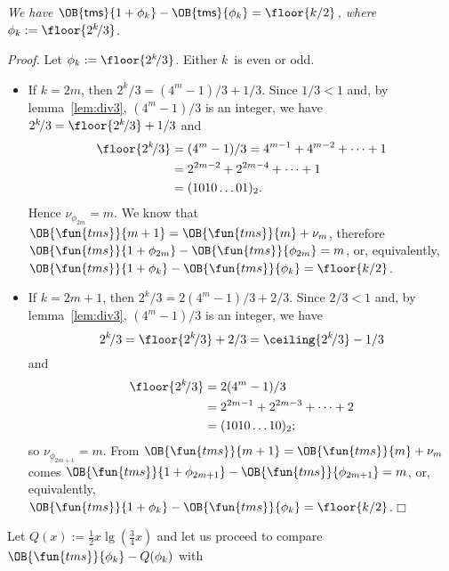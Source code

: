 \begin{thm}
\label{thm:OB_lambda}
\textsl{We have \(\OB{\mathsf{tms}}{1+\phi_k} -
  \OB{\mathsf{tms}}{\phi_k} = \floor{k/2}\), where \(\phi_k :=
  \floor{2^k\!/3}\).}
\end{thm}
\noindent \emph{Proof.} Let \(\phi_k := \floor{2^k\!/3}\). Either
\(k\)~is even or odd.
\begin{itemize}

  \item If \(k=2m\), then \(2^k\!/3 = (4^m-1)/3 + 1/3\). Since
    \(1/3<1\) and, by lemma~\ref{lem:div3}, \((4^m-1)/3\) is an
    integer, we have \(2^k\!/3 = \floor{2^k\!/3} + 1/3\) and
    \begin{align*}
      \floor{2^k\!/3} &= (4^m-1)/3 = 4^{m-1} + 4^{m-2} + \dots + 1\\
                      &= 2^{2m-2} + 2^{2m-4} + \dots + 1\\
                      &= (1010\dots01)_2.
    \end{align*}
    Hence \(\nu_{\phi_{2m}} = m\). We know that \(\OB{\fun{tms}}{m+1} =
    \OB{\fun{tms}}{m} + \nu_m\), therefore
    \(\OB{\fun{tms}}{1+\phi_{2m}} - \OB{\fun{tms}}{\phi_{2m}} = m\),
    or, equivalently, \(\OB{\fun{tms}}{1+\phi_k} -
    \OB{\fun{tms}}{\phi_k} = \floor{k/2}\).

  \item If \(k=2m+1\), then \(2^k\!/3 = 2(4^m-1)/3 + 2/3\). Since
    \(2/3<1\) and, by lemma~\ref{lem:div3}, \((4^m-1)/3\) is an
    integer, we have
    \begin{equation*}
      2^k\!/3 = \floor{2^k\!/3} + 2/3 = \ceiling{2^k\!/3} - 1/3
    \end{equation*}
    and
    \begin{align*}
      \floor{2^k\!/3} &= 2(4^m-1)/3\\
                      &= 2^{2m-1} + 2^{2m-3} + \dots + 2\\
                      &= (1010\dots10)_2;
    \end{align*}
    so \(\nu_{\phi_{2m+1}} = m\). From \(\OB{\fun{tms}}{m+1} =
    \OB{\fun{tms}}{m} + \nu_m\) comes \(\OB{\fun{tms}}{1+\phi_{2m+1}}
    - \OB{\fun{tms}}{\phi_{2m+1}} = m\), or,
    equivalently,
    \(\OB{\fun{tms}}{1+\phi_k} - \OB{\fun{tms}}{\phi_k} =
    \floor{k/2}\).\hfill\(\Box\)

\end{itemize}
\noindent Let \(Q(x) := \tfrac{1}{2}x\lg(\tfrac{3}{4}x)\) and let us
proceed to compare \(\OB{\fun{tms}}{\phi_k} - Q(\phi_k)\) with
